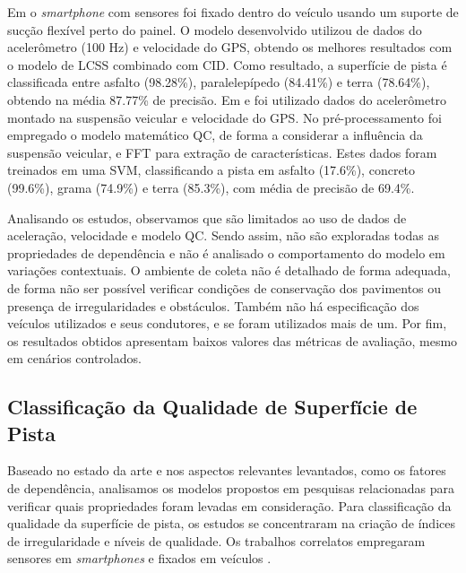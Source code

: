 Em \cite{Souza2018} o \textit{smartphone} com sensores foi fixado dentro do veículo usando um suporte de sucção flexível perto do painel. O modelo desenvolvido utilizou de dados do acelerômetro (100 Hz) e velocidade do GPS, obtendo os melhores resultados com o modelo de LCSS combinado com CID. Como resultado, a superfície de pista é classificada entre asfalto (98.28\%), paralelepípedo (84.41\%) e terra (78.64\%), obtendo na média 87.77\% de precisão. Em  \cite{Wang2018_1} e \cite{Wang2017} foi utilizado dados do acelerômetro montado na suspensão veicular e velocidade do GPS. No pré-processamento foi empregado o modelo matemático QC, de forma a considerar a influência da suspensão veicular, e FFT para extração de características. Estes dados foram treinados em uma SVM, classificando a pista em asfalto (17.6\%), concreto (99.6\%), grama (74.9\%) e terra (85.3\%), com média de precisão de 69.4\%. 

Analisando os estudos, observamos que são limitados ao uso de dados de aceleração, velocidade e modelo QC. Sendo assim, não são exploradas todas as propriedades de dependência e não é analisado o comportamento do modelo em variações contextuais. O ambiente de coleta não é detalhado de forma adequada, de forma não ser possível verificar condições de conservação dos pavimentos ou presença de irregularidades e obstáculos. Também não há especificação dos veículos utilizados e seus condutores, e se foram utilizados mais de um. Por fim, os resultados obtidos apresentam baixos valores das métricas de avaliação, mesmo em cenários controlados.

\subsection{Classificação da Qualidade de Superfície de Pista}

Baseado no estado da arte e nos aspectos relevantes levantados, como os fatores de dependência, analisamos os modelos propostos em pesquisas relacionadas para verificar quais propriedades foram levadas em consideração. Para classificação da qualidade da superfície de pista, os estudos se concentraram na criação de índices de irregularidade e níveis de qualidade. Os trabalhos correlatos empregaram sensores em \textit{smartphones} \cite{Douangphachanh2014_1,Lima2016,Brunauer2016,Zhao2016,Allouch2017,Souza2018_1,Li2018,Nunes2019,Tiwari2020,Badurowicz2020,AbdelRaheem2020} e fixados em veículos \cite{Chen2013, Chen2016,Pitonak2016,Prapulla2017,Pont2017,Lei2018,Hassan2019,AbdelRaheem2020,Monica2021}.


